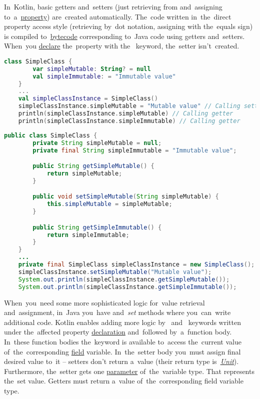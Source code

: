 \label{kotlingetset}
In~Kotlin, basic getters and~setters (just retrieving from and~assigning to~a~\hyperref[variablefieldproperty]{property}) are~created automatically.
The~code written in~the~direct property access style (retrieving by~dot notation, assigning with the~equals sign) is compiled to~\hyperref[javabytecode]{bytecode} corresponding to~Java code using getters and~setters.
When~you \hyperref[declarationdefinition]{declare} the~property with the~ keyword, the~setter isn't~created.

\example
\begin{lstlisting}[language=Kotlin, title={Direct property access in Kotlin}]
    class SimpleClass {
        var simpleMutable: String? = null
        val simpleImmutable: = "Immutable value"
    }
    ...
    val simpleClassInstance = SimpleClass()
    simpleClassInstance.simpleMutable = "Mutable value" // Calling setter
    println(simpleClassInstance.simpleMutable) // Calling getter
    println(simpleClassInstance.simpleImmutable) // Calling getter
\end{lstlisting}
\newpage

\begin{lstlisting}[language=Java, title={Java equivalent}]
    public class SimpleClass {
        private String simpleMutable = null;
        private final String simpleImmutable = "Immutable value";

        public String getSimpleMutable() {
            return simpleMutable;
        }

        public void setSimpleMutable(String simpleMutable) {
            this.simpleMutable = simpleMutable;
        }

        public String getSimpleImmutable() {
            return simpleImmutable;
        }
    }
    ...
    private final SimpleClass simpleClassInstance = new SimpleClass();
    simpleClassInstance.setSimpleMutable("Mutable value");
    System.out.println(simpleClassInstance.getSimpleMutable());
    System.out.println(simpleClassInstance.getSimpleImmutable());
\end{lstlisting}
\newline

\noindent When~you~need some more sophisticated logic for~value retrieval and~assignment, in~Java you~have  \mbox{and \textit{set}} methods where you~can~write additional code.
Kotlin enables adding more logic \mbox{by } \mbox{and } keywords written under the~affected property \hyperref[declarationdefinition]{declaration} and~followed by~a~function body.
In~these function bodies the~keyword  is available to~access the~current value of~the~corresponding \hyperref[variablefieldproperty]{field} variable.
In~the~setter body you~must assign final desired value to~it -- setters don't return a~value (their return type \mbox{is \hyperref[kotlinunit]{\textit{Unit}}}).
Furthermore, the~setter gets one \hyperref[parameterargument]{parameter} of~the~variable type.
That represents the~set value.
Getters must return a~value of~the~corresponding field variable type.
\newpage


